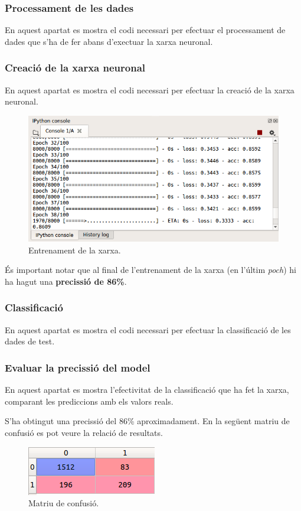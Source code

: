 \documentclass[12pt]{article}
\begin{document}
\subsubsection{Processament de les dades}
En aquest apartat es mostra el codi necessari per efectuar el processament de dades que s'ha de fer abans d'exectuar la xarxa neuronal.


\subsubsection{Creació de la xarxa neuronal}
En aquest apartat es mostra el codi necessari per efectuar la creació de la xarxa neuronal.

\begin{figure}[h!]
	\centering
	\includegraphics[scale=0.4]{imatges/python/entrenament.png}
	\caption{Entrenament de la xarxa.}
\end{figure}
\pagebreak
És important notar que al final de l'entrenament de la xarxa (en l'últim \textit{poch}) hi ha hagut una \textbf{precissió de 86\%}.

\subsubsection{Classificació}
En aquest apartat es mostra el codi necessari per efectuar la classificació de les dades de test.


\pagebreak
\subsubsection{Evaluar la precissió del model}
En aquest apartat es mostra l'efectivitat de la classificació que ha fet la xarxa, comparant les prediccions amb els valors reals.

S'ha obtingut una precissió del 86\% aproximadament. En la següent matriu de confusió es pot veure la relació de resultats.
\begin{figure}[h!]
	\centering
	\includegraphics[scale=0.7]{imatges/python/cm.png}
	\caption{Matriu de confusió.}
\end{figure}
\end{document}
